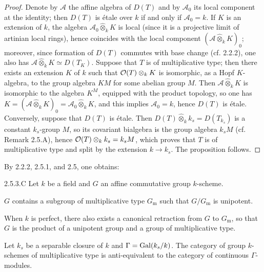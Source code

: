 \begin{proof}
Denote by $\mathscr A$ the affine algebra of $D(T)$ and by $\mathscr A_0$ its local component at the identity; then $D(T)$ is étale over $k$ if and only if $\mathscr A_0=k$. If $K$ is an extension of $k$, the algebra $\mathscr A_0\widehat\otimes_k K$ is local (since it is a projective limit of artinian local rings), hence coincides with the local component $(\mathscr A\widehat\otimes_k K)_0$; moreover, since formation of $D(T)$ commutes with base change (cf. 2.2.2), one also has $\mathscr A\widehat\otimes_k K\simeq D(T_K)$.
Suppose that $T$ is of multiplicative type; then there exists an extension $K$ of $k$ such that $\mathcal{O}(T)\otimes_k K$ is isomorphic, as a Hopf $K$-algebra, to the group algebra $KM$ for some abelian group $M$. Then $\mathscr A\widehat\otimes_k K$ is isomorphic to the algebra $K^M$, equipped with the product topology, so one has $K=(\mathscr A\widehat\otimes_k K)_0=\mathscr A_0\widehat\otimes_k K$, and this implies $\mathscr A_0=k$, hence $D(T)$ is étale.
Conversely, suppose that $D(T)$ is étale. Then $D(T)\widehat\otimes_k k_s=D(T_{k_s})$ is a constant $k_s$-group $M$, so its covariant bialgebra is the group algebra $k_sM$ (cf. Remark 2.5.A), hence $\mathcal{O}(T)\otimes_k k_s=k_sM$, which proves that $T$ is of multiplicative type and split by the extension $k\to k_s$. The proposition follows.
\end{proof}
By 2.2.2, 2.5.1, and 2.5, one obtains:
\begin{corollary}{2.5.3.C}\label{VIIB.2.5.3.C}
Let $k$ be a field and $G$ an affine commutative group $k$-scheme.
\begin{enumeratei}
\item $G$ contains a subgroup of multiplicative type $G_{\mathrm m}$ such that $G/G_{\mathrm m}$ is unipotent.
\item When $k$ is perfect, there also exists a canonical retraction from $G$ to $G_{\mathrm m}$, so that $G$ is the product of a unipotent group and a group of multiplicative type.
\item{}Let $k_s$ be a separable closure of $k$ and $\Gamma=\operatorname{Gal}(k_s/k)$. The category of group $k$-schemes of multiplicative type is anti-equivalent to the category of continuous $\Gamma$-modules.
\end{enumeratei}
\end{corollary}

